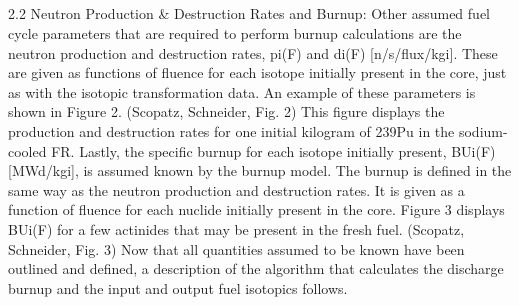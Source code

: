 \subsection{}
\label{1g_sec:}
2.2 Neutron Production & Destruction Rates and Burnup:
Other assumed fuel cycle parameters that are required to perform burnup calculations are the neutron production and destruction rates, pi(F) and di(F) [n/s/flux/kgi].  These are given as functions of fluence for each isotope initially present in the core, just as with the isotopic transformation data.   An example of these parameters is shown in Figure 2.  
(Scopatz, Schneider, Fig. 2)
This figure displays the production and destruction rates for one initial kilogram of 239Pu in the sodium-cooled FR.   
Lastly, the specific burnup for each isotope initially present, BUi(F) [MWd/kgi], is assumed known by the burnup model.  The burnup is defined in the same way as the neutron production and destruction rates.  It is given as a function of fluence for each nuclide initially present in the core.  Figure 3 displays BUi(F) for a few actinides that may be present in the fresh fuel.
(Scopatz, Schneider, Fig. 3)
Now that all quantities assumed to be known have been outlined and defined, a description of the algorithm that calculates the discharge burnup and the input and output fuel isotopics follows.   

